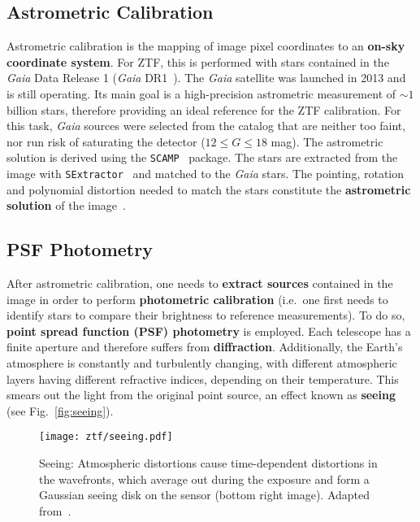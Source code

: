 \subsection{Astrometric Calibration}
Astrometric calibration is the mapping of image pixel coordinates to an \textbf{on-sky coordinate system}. For ZTF, this is performed with stars contained in the \textit{Gaia} Data Release 1 (\textit{Gaia} DR1~). The \textit{Gaia} satellite was launched in 2013 and is still operating. Its main goal is a high-precision astrometric measurement of $\sim1$ billion stars, therefore providing an ideal reference for the ZTF calibration. For this task, \textit{Gaia} sources were selected from the catalog that are neither too faint, nor run risk of saturating the detector ($12 \leq G \leq 18$ mag). The astrometric solution is derived using the \texttt{SCAMP}~ package. The stars are extracted from the image with \texttt{SExtractor}~ and matched to the \textit{Gaia} stars. The pointing, rotation and polynomial distortion needed to match the stars constitute the \textbf{astrometric solution} of the image~.

\subsection{PSF Photometry}\label{psfphot}
After astrometric calibration, one needs to \textbf{extract sources} contained in the image in order to perform \textbf{photometric calibration} (i.e.\ one first needs to identify stars to compare their brightness to reference measurements). To do so, \textbf{point spread function (PSF) photometry} is employed. Each telescope has a finite aperture and therefore suffers from \textbf{diffraction}. Additionally, the Earth's atmosphere is constantly and turbulently changing, with different atmospheric layers having different refractive indices, depending on their temperature. This smears out the light from the original point source, an effect known as \textbf{seeing} (see Fig.~\ref{fig:seeing}).

\begin{figure}[h!]
    \texttt{[image: ztf/seeing.pdf]}
    \caption[Seeing]{Seeing: Atmospheric distortions cause time-dependent distortions in the wavefronts, which average out during the exposure and form a Gaussian seeing disk on the sensor (bottom right image). Adapted from~\cite{Chromey2016}.}
\end{figure}

